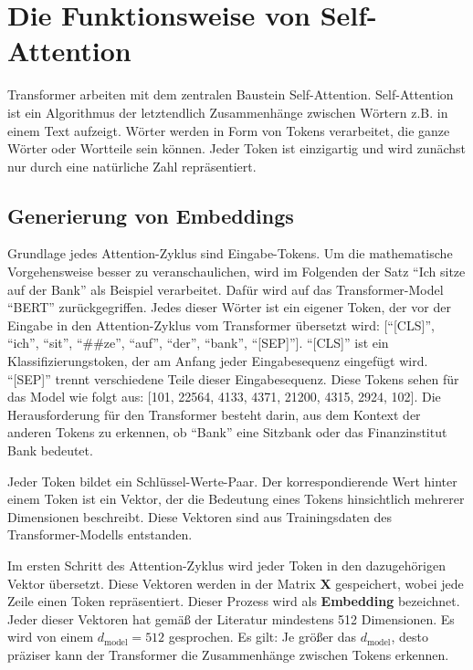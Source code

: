 \chapter{Die Funktionsweise von Self-Attention}

Transformer arbeiten mit dem zentralen Baustein Self-Attention.
Self-Attention ist ein Algorithmus der letztendlich Zusammenhänge zwischen Wörtern z.B. in einem Text aufzeigt.
Wörter werden in Form von Tokens verarbeitet, die ganze Wörter oder Wortteile sein können.
Jeder Token ist einzigartig und wird zunächst nur durch eine natürliche Zahl repräsentiert.

\section{Generierung von Embeddings}

Grundlage jedes Attention-Zyklus sind Eingabe-Tokens.  
Um die mathematische Vorgehensweise besser zu veranschaulichen, wird im Folgenden der Satz \enquote{Ich sitze auf der Bank} als Beispiel verarbeitet.
Dafür wird auf das Transformer-Model \enquote{BERT} zurückgegriffen.
Jedes dieser Wörter ist ein eigener Token, der vor der Eingabe in den Attention-Zyklus vom Transformer übersetzt wird:
[\enquote{[CLS]}, \enquote{ich}, \enquote{sit}, \enquote{##ze}, \enquote{auf}, \enquote{der}, \enquote{bank}, \enquote{[SEP]}].  
\enquote{[CLS]} ist ein Klassifizierungstoken, der am Anfang jeder Eingabesequenz eingefügt wird.
\enquote{[SEP]} trennt verschiedene Teile dieser Eingabesequenz.
Diese Tokens sehen für das Model wie folgt aus: [101, 22564, 4133, 4371, 21200, 4315, 2924, 102].
Die Herausforderung für den Transformer besteht darin, aus dem Kontext der anderen Tokens zu erkennen, ob \enquote{Bank} eine Sitzbank oder das Finanzinstitut Bank bedeutet.

Jeder Token bildet ein Schlüssel-Werte-Paar.
Der korrespondierende Wert hinter einem Token ist ein Vektor, der die Bedeutung eines Tokens hinsichtlich mehrerer Dimensionen beschreibt.  
Diese Vektoren sind aus Trainingsdaten des Transformer-Modells entstanden.

Im ersten Schritt des Attention-Zyklus wird jeder Token in den dazugehörigen Vektor übersetzt.  
Diese Vektoren werden in der Matrix $\mathbf{X}$ gespeichert, wobei jede Zeile einen Token repräsentiert.  
Dieser Prozess wird als \textbf{Embedding} bezeichnet.  
Jeder dieser Vektoren hat gemäß der Literatur mindestens 512 Dimensionen.  
Es wird von einem \( d_{\text{model}} = 512 \) gesprochen.  
Es gilt: Je größer das \( d_{\text{model}} \), desto präziser kann der Transformer die Zusammenhänge zwischen Tokens erkennen.

